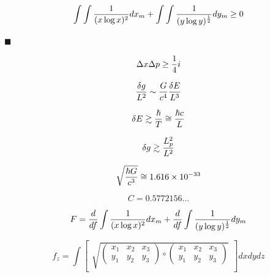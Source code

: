 \documentclass{jsarticle}
\begin{document}
\begin{equation}
   \int \int {1 \over (x \log x)^2}dx_{m} + 
	\int \int {1 \over (y \log y)^{1 \over 2}}dy_{m} \ge 0
\end{equation}
\begin{flushright}
$\blacksquare$
\end{flushright}



\begin{equation}
   \Delta x \Delta p \ge {1 \over 4}i 
\end{equation}

\begin{equation}
   {\delta g \over L^2} \sim {G \over c^4}{\delta E \over L^3}
\end{equation}

\begin{equation}
   \delta E \gtrsim {\hbar \over T} \cong {\hbar c \over L} 
\end{equation}

\begin{equation}
   \delta g \gtrsim {L^2_{p} \over L^2} 
\end{equation}

\begin{equation}
   \sqrt{\hbar G \over c^3} \cong 1.616 \times 10^{-33} 
\end{equation}


\begin{equation}
   C = 0.5772156 \dots 
\end{equation}

\begin{equation}
  F = {d \over df} \int {1 \over (x \log x)^2}dx_{m} 
	+ {d \over df} \int {1 \over (y \log y)^{1 \over 2}}dy_{m} 
\end{equation}

\begin{equation}
    f_{z} = \int \begin{bmatrix} \sqrt{\begin{pmatrix} x_{1} & x_{2} & x_{3} \\
  y_{1} & y_{2} & y_{3} \end{pmatrix}
     \circ
   \begin{pmatrix} x_{1} & x_{2} & x_{3} \\
  y_{1} & y_{2} & y_{3} \end{pmatrix}}_{}
     \end{bmatrix}dxdydz 
\end{equation}
\end{document}
